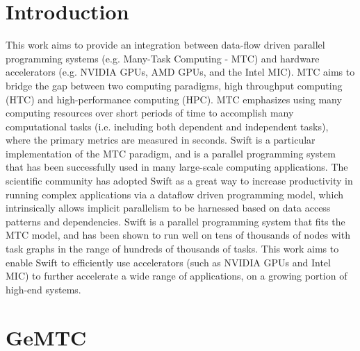 \documentclass[conference]{IEEEtran}
\begin{document}
\section{Introduction}
This work aims to provide an integration between data-flow driven parallel programming systems (e.g. Many-Task Computing - MTC) and hardware accelerators \cite{kriederGCASR12} (e.g. NVIDIA GPUs, AMD GPUs, and the Intel MIC). MTC aims to bridge the gap between two computing paradigms, high throughput computing (HTC) and high-performance computing (HPC). MTC emphasizes using many computing resources over short periods of time to accomplish many computational tasks (i.e. including both dependent and independent tasks), where the primary metrics are measured in seconds.\cite{raicu2008toward} Swift is a particular implementation of the MTC paradigm, and is a parallel programming system that has been successfully used in many large-scale computing applications. \cite{zhao2007swift} The scientific community has adopted Swift as a great way to increase productivity in running complex applications via a dataflow driven programming model, which intrinsically allows implicit parallelism to be harnessed based on data access patterns and dependencies. Swift is a parallel programming system that fits the MTC model, and has been shown to run well on tens of thousands of nodes with task graphs in the range of hundreds of thousands of tasks. This work aims to enable Swift to efficiently use accelerators (such as NVIDIA GPUs and Intel MIC) to further accelerate a wide range of applications, on a growing portion of high-end systems.

\section{GeMTC}
\end{document}
